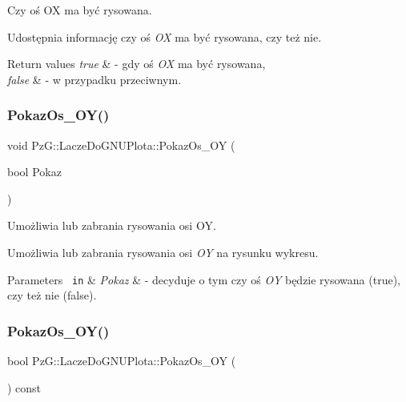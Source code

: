 Czy oś OX ma być rysowana. 

Udostępnia informację czy oś {\itshape OX} ma być rysowana, czy też nie. 
\begin{DoxyRetVals}{Return values}
{\em true} & -\/ gdy oś {\itshape OX} ma być rysowana, \\
\hline
{\em false} & -\/ w przypadku przeciwnym. \\
\hline
\end{DoxyRetVals}
\mbox{\label{class_pz_g_1_1_lacze_do_g_n_u_plota_a7c3db909b266fc30808e86406c04b516}} 
\subsubsection{\texorpdfstring{PokazOs\_OY()}{PokazOs\_OY()}\hspace{0.1cm}{\footnotesize\ttfamily [1/2]}}
{\footnotesize\ttfamily void Pz\+G\+::\+Lacze\+Do\+G\+N\+U\+Plota\+::\+Pokaz\+Os\+\_\+\+OY (\begin{DoxyParamCaption}\item[{bool}]{Pokaz }\end{DoxyParamCaption})\hspace{0.3cm}{\ttfamily [inline]}}



Umożliwia lub zabrania rysowania osi OY. 

Umożliwia lub zabrania rysowania osi {\itshape OY} na rysunku wykresu. 
\begin{DoxyParams}[1]{Parameters}
\mbox{\texttt{ in}}  & {\em Pokaz} & -\/ decyduje o tym czy oś {\itshape OY} będzie rysowana ({\ttfamily true}), czy też nie ({\ttfamily false}). \\
\hline
\end{DoxyParams}
\mbox{\label{class_pz_g_1_1_lacze_do_g_n_u_plota_a7298f469f6932f5c808dcf620650b4b8}} 
\subsubsection{\texorpdfstring{PokazOs\_OY()}{PokazOs\_OY()}\hspace{0.1cm}{\footnotesize\ttfamily [2/2]}}
{\footnotesize\ttfamily bool Pz\+G\+::\+Lacze\+Do\+G\+N\+U\+Plota\+::\+Pokaz\+Os\+\_\+\+OY (\begin{DoxyParamCaption}{ }\end{DoxyParamCaption}) const\hspace{0.3cm}{\ttfamily [inline]}}



